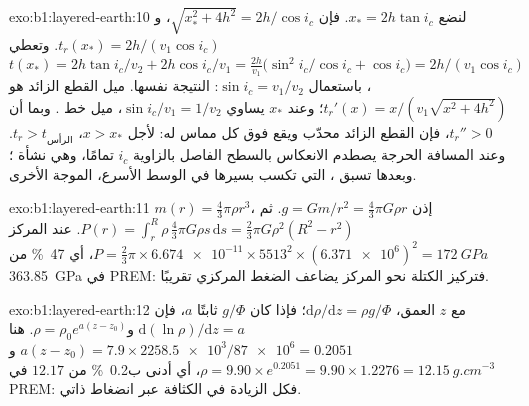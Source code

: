 \begin{solution}{exo:b1:layered-earth:10}
لنضع $x_* = 2h\tan i_c$. فإن $\sqrt{x_*^2 + 4h^2} = 2h/\cos i_c$، و
$t_r(x_*) = 2h/(v_1\cos i_c)$. وتعطي 
$t(x_*) = 2h\tan i_c/v_2 + 2h\cos i_c/v_1 = \frac{2h}{v_1}\bigl(\sin^2 i_c/\cos
i_c + \cos i_c\bigr) = 2h/(v_1\cos i_c)$، باستعمال $\sin i_c = v_1/v_2$: النتيجة نفسها.
ميل القطع الزائد هو $t_r'(x) = x/(v_1\sqrt{x^2 + 4h^2})$؛ وعند $x_*$ يساوي
$\sin i_c/v_1 = 1/v_2$، ميل خط . وبما أن
$t_r'' > 0$، فإن القطع الزائد محدّب ويقع فوق كل مماس له: لأجل
$x > x_*$، $t_r > t_{\text{الرأس}}$. وعند المسافة الحرجة يصطدم الانعكاس بالسطح الفاصل بالزاوية $i_c$ تمامًا، وهي نشأة ؛ وبعدها تسبق ، التي تكسب بسيرها في الوسط الأسرع، الموجة الأخرى.
\end{solution}

\begin{solution}{exo:b1:layered-earth:11}
$m(r) = \tfrac43\pi\rho r^3$، إذن $g = Gm/r^2 = \tfrac43\pi G\rho r$. ثم
$P(r) = \int_r^R \rho\,\tfrac43\pi G\rho s\,\mathrm ds = \tfrac23\pi G\rho^2(R^2
- r^2)$. عند المركز $P = \tfrac23\pi\times\num{6.674e-11}\times5513^2\times
(\num{6.371e6})^2 = \qty{172}{GPa}$، أي \qty{47}{\percent} من \qty{363.85}{GPa} في PREM: فتركيز الكتلة نحو المركز يضاعف الضغط المركزي تقريبًا.
\end{solution}

\begin{solution}{exo:b1:layered-earth:12}
مع $z$ العمق، $\mathrm d\rho/\mathrm dz = \rho g/\Phi$؛ فإذا كان $g/\Phi$ ثابتًا $a$، فإن $\mathrm d(\ln\rho)/\mathrm dz = a$ و$\rho = \rho_0
e^{a(z - z_0)}$. هنا $a(z - z_0) = 7.9\times\num{2258.5e3}/\num{87e6} =
0.2051$ و$\rho = 9.90\times e^{0.2051} = 9.90\times1.2276 =
\qty{12.15}{g.cm^{-3}}$، أي أدنى ب\qty{0.2}{\percent} من $12.17$ في PREM: فكل الزيادة في الكثافة عبر  انضغاط ذاتي.
\end{solution}

